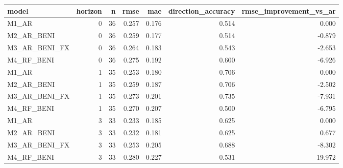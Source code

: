 \begin{tabular}{lrrrrrr}
\toprule
model & horizon & n & rmse & mae & direction\_accuracy & rmse\_improvement\_vs\_ar \\
\midrule
M1\_AR & 0 & 36 & 0.257 & 0.176 & 0.514 & 0.000 \\
M2\_AR\_BENI & 0 & 36 & 0.259 & 0.177 & 0.514 & -0.879 \\
M3\_AR\_BENI\_FX & 0 & 36 & 0.264 & 0.183 & 0.543 & -2.653 \\
M4\_RF\_BENI & 0 & 36 & 0.275 & 0.192 & 0.600 & -6.926 \\
M1\_AR & 1 & 35 & 0.253 & 0.180 & 0.706 & 0.000 \\
M2\_AR\_BENI & 1 & 35 & 0.259 & 0.187 & 0.706 & -2.502 \\
M3\_AR\_BENI\_FX & 1 & 35 & 0.273 & 0.201 & 0.735 & -7.931 \\
M4\_RF\_BENI & 1 & 35 & 0.270 & 0.207 & 0.500 & -6.795 \\
M1\_AR & 3 & 33 & 0.233 & 0.185 & 0.625 & 0.000 \\
M2\_AR\_BENI & 3 & 33 & 0.232 & 0.181 & 0.625 & 0.677 \\
M3\_AR\_BENI\_FX & 3 & 33 & 0.253 & 0.205 & 0.688 & -8.302 \\
M4\_RF\_BENI & 3 & 33 & 0.280 & 0.227 & 0.531 & -19.972 \\
\bottomrule
\end{tabular}
